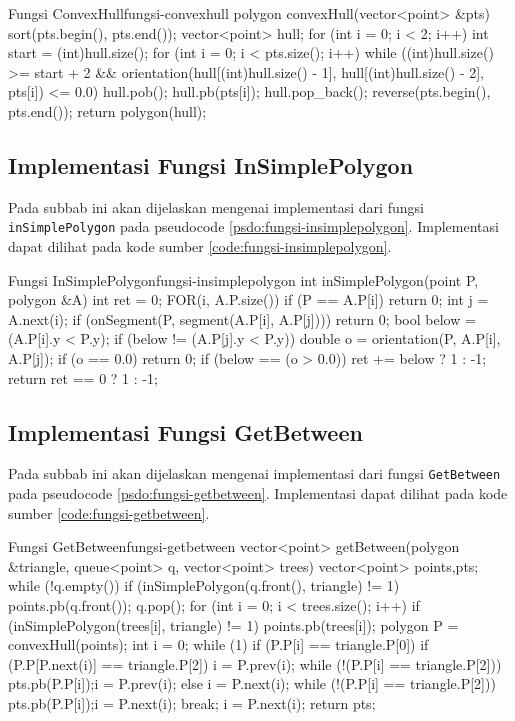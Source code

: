 \begin{code}[firstnumber=1]{Fungsi ConvexHull}{fungsi-convexhull}
polygon convexHull(vector<point> &pts){
	sort(pts.begin(), pts.end());
	vector<point> hull;
	for (int i = 0; i < 2; i++){
		int start = (int)hull.size();
		for (int i = 0; i < pts.size(); i++){
			while ((int)hull.size() >= start + 2 && orientation(hull[(int)hull.size() - 1], hull[(int)hull.size() - 2], pts[i]) <= 0.0)
				hull.pob();
			hull.pb(pts[i]);
		}
		hull.pop_back();
		reverse(pts.begin(), pts.end());
	}
	return polygon(hull);
}
\end{code}

\subsection{ Implementasi Fungsi InSimplePolygon}
Pada subbab ini akan dijelaskan mengenai implementasi dari fungsi \texttt{inSimplePolygon} pada pseudocode \ref{psdo:fungsi-insimplepolygon}. Implementasi dapat dilihat pada kode sumber \ref{code:fungsi-insimplepolygon}.

\begin{code}[firstnumber=1]{Fungsi InSimplePolygon}{fungsi-insimplepolygon}
int inSimplePolygon(point P, polygon &A){
	int ret = 0;
	FOR(i, A.P.size()){
		if (P == A.P[i])
			return 0;
		int j = A.next(i);
		if (onSegment(P, segment(A.P[i], A.P[j])))
			return 0;
		bool below = (A.P[i].y < P.y);
		if (below != (A.P[j].y < P.y)){
			double o = orientation(P, A.P[i], A.P[j]);
			if (o == 0.0)
				return 0;
			if (below == (o > 0.0))
				ret += below ? 1 : -1;
		}
	}
	return ret == 0 ? 1 : -1;
}
\end{code}

\subsection{ Implementasi Fungsi GetBetween}
Pada subbab ini akan dijelaskan mengenai implementasi dari fungsi \texttt{GetBetween} pada pseudocode \ref{psdo:fungsi-getbetween}. Implementasi dapat dilihat pada kode sumber \ref{code:fungsi-getbetween}.

\newpage
\begin{code}[firstnumber=1]{Fungsi GetBetween}{fungsi-getbetween}
vector<point> getBetween(polygon &triangle, queue<point> q, vector<point> trees){
	vector<point> points,pts;
	while (!q.empty()){
		if (inSimplePolygon(q.front(), triangle) != 1){
			points.pb(q.front());
		}
		q.pop();
	}
	for (int i = 0; i < trees.size(); i++){
		if (inSimplePolygon(trees[i], triangle) != 1){
			points.pb(trees[i]);
		}
	}
	polygon P = convexHull(points);
	int i = 0;
	while (1){
		if (P.P[i] == triangle.P[0]){
			if (P.P[P.next(i)] == triangle.P[2]){
				i = P.prev(i);
				while (!(P.P[i] == triangle.P[2])){
					pts.pb(P.P[i]);i = P.prev(i);
				}
			}
			else{
				i = P.next(i);
				while (!(P.P[i] == triangle.P[2])){
					pts.pb(P.P[i]);i = P.next(i);
				}
			}
			break;
		}
		i = P.next(i);
	}
	return pts;
}	
\end{code}

